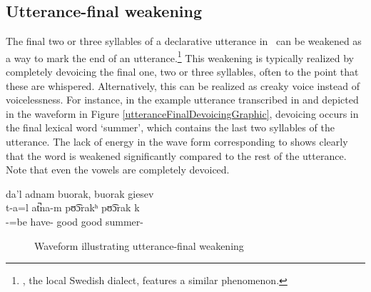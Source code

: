 \FB

\subsection{Utterance-final weakening}\label{utteranceFinalDevoicing}
The final two or three syllables of a declarative utterance in \PS\ can be weakened as a way to mark the end of an utterance.\footnote{, the local Swedish dialect, features a similar phenomenon.} 
This weakening is typically realized by completely devoicing the final one, two or three syllables, often to the point that these are whispered. Alternatively, this can be realized as creaky voice instead of voicelessness. For instance, in the example utterance transcribed in  and depicted in the waveform in Figure \vref{utteranceFinalDevoicingGraphic}, devoicing occurs in the final lexical word  ‘summer’, which contains the last two syllables of the utterance. 
The lack of energy in the wave form corresponding to  shows clearly that the word is weakened significantly compared to the rest of the utterance. Note that even the vowels are completely devoiced.

\ea\label{utteranceFinalDevoicing1}%
\glll	da’l adnam buorak, buorak giesev\\
	t-a=l at̚na-m pʊ͡ɔrakʰ pʊ͡ɔrak k\\
	-=be\BS{} have- good good summer-\\\nopagebreak
{} 
\z
\begin{figure}[h]
\caption{Waveform illustrating utterance-final weakening}\label{utteranceFinalDevoicingGraphic}
\end{figure}


